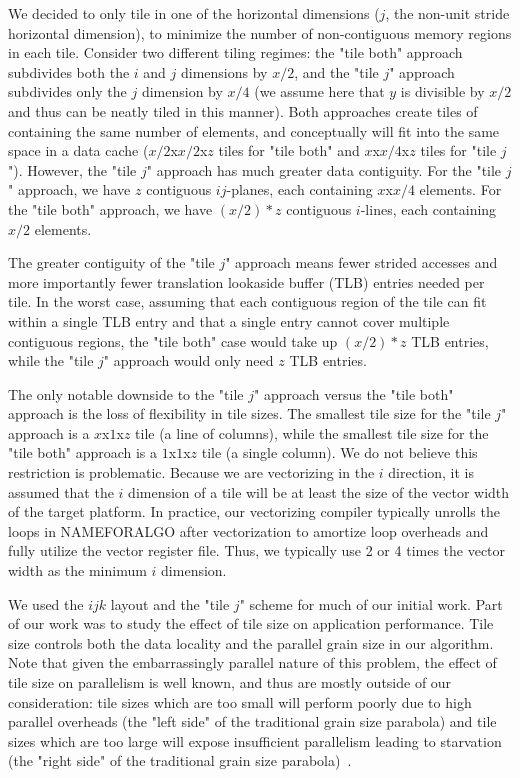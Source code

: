 \documentclass[conference]{IEEEtran}
\begin{document}
We decided to only tile in one of the horizontal dimensions (\(j\), the
non-unit stride horizontal dimension), to minimize the number of non-contiguous
memory regions in each tile. Consider two different tiling regimes: the "tile
both" approach subdivides both the \(i\) and \(j\) dimensions by \(x/2\), and
the "tile \(j\)" approach subdivides only the \(j\) dimension by \(x/4\) (we
assume here that \(y\) is divisible by \(x/2\) and thus can be neatly tiled in
this manner). Both approaches create tiles of containing the same number of
elements, and conceptually will fit into the same space in a data cache
(\(x/2\)x\(x/2\)x\(z\) tiles for "tile both" and \(x\)x\(x/4\)x\(z\) tiles for
"tile \(j\)"). However, the "tile \(j\)" approach has much greater data
contiguity. For the "tile \(j\)" approach, we have \(z\) contiguous
\(ij\)-planes, each containing \(x\)x\(x/4\) elements.  For the "tile both"
approach, we have \((x/2)*z\) contiguous \(i\)-lines, each containing \(x/2\)
elements.

The greater contiguity of the "tile \(j\)" approach means fewer strided
accesses and more importantly fewer translation lookaside buffer (TLB) entries
needed per tile. In the worst case, assuming that each contiguous region of the
tile can fit within a single TLB entry and that a single entry cannot cover
multiple contiguous regions, the "tile both" case would take up \((x/2)*z\) TLB
entries, while the "tile \(j\)" approach would only need \(z\) TLB entries.

The only notable downside to the "tile \(j\)" approach versus the "tile both"
approach is the loss of flexibility in tile sizes. The smallest tile size for
the "tile \(j\)" approach is a \(x\)x\(1\)x\(z\) tile (a line of columns),
while the smallest tile size for the "tile both" approach is a
\(1\)x\(1\)x\(z\) tile (a single column). We do not believe this restriction is
problematic. Because we are vectorizing in the \(i\) direction, it is assumed
that the \(i\) dimension of a tile will be at least the size of the vector
width of the target platform. In practice, our vectorizing compiler typically
unrolls the loops in NAMEFORALGO after vectorization to amortize loop overheads
and fully utilize the vector register file. Thus, we typically use 2 or 4 times
the vector width as the minimum \(i\) dimension. 

We used the \(ijk\) layout and the "tile \(j\)" scheme for much of our initial
work. Part of our work was to study the effect of tile size on application
performance.  Tile size controls both the data locality and the parallel grain
size in our algorithm. Note that given the embarrassingly parallel nature of
this problem, the effect of tile size on parallelism is well known, and thus
are mostly outside of our consideration: tile sizes which are too small will
perform poorly due to high parallel overheads (the "left side" of the
traditional grain size parabola) and tile sizes which are too large will expose
insufficient parallelism leading to starvation (the "right side" of the
traditional grain size parabola)~\cite{some_parallex_thing}.
\end{document}
